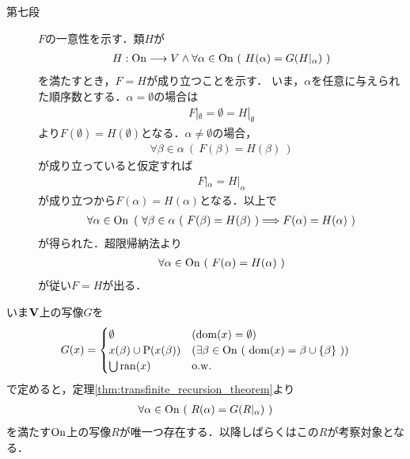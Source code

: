 \begin{prf}
\begin{description}
			\item[第七段]
				$F$の一意性を示す．類$H$が
				\begin{align}
					H:\mathrm{On} \longrightarrow V 
					\wedge \forall \alpha \in \mathrm{On}\ (\ H(\alpha) = G(H|_\alpha)\ )
				\end{align}
				を満たすとき，$F = H$が成り立つことを示す．
				いま，$\alpha$を任意に与えられた順序数とする．$\alpha = \emptyset$の場合は
				\begin{align}
					F|_\emptyset = \emptyset = H|_\emptyset
				\end{align}
				より$F(\emptyset) = H(\emptyset)$となる．$\alpha \neq \emptyset$の場合，
				\begin{align}
					\forall \beta \in \alpha\ (\ F(\beta) = H(\beta)\ )
				\end{align}
				が成り立っていると仮定すれば
				\begin{align}
					F|_\alpha = H|_\alpha
				\end{align}
				が成り立つから$F(\alpha) = H(\alpha)$となる．以上で
				\begin{align}
					\forall \alpha \in \ON\ \left(\ \forall \beta \in \alpha\ 
					(\ F(\beta) = H(\beta)\ ) \Longrightarrow F(\alpha) = H(\alpha)\ \right)
				\end{align}
				が得られた．超限帰納法より
				\begin{align}
					\forall \alpha \in \mathrm{On}\ (\ F(\alpha) = H(\alpha)\ )
				\end{align}
				が従い$F = H$が出る．
				\QED
		\end{description}
	\end{prf}
	
	いま$\mathbf{V}$上の写像$G$を
	\begin{align}
		G(x) = 
		\begin{cases}
			\emptyset & (\operatorname{dom}(x) = \emptyset) \\
			x(\beta) \cup \operatorname{P}(x(\beta)) & (
			\exists \beta \in \mathrm{On}\ (\ \operatorname{dom}(x) = \beta \cup \{\beta\}\ )) \\
			\bigcup \operatorname{ran}(x) & \mathrm{o.w.}
		\end{cases}
	\end{align}
	で定めると，定理\ref{thm:transfinite_recursion_theorem}より
	\begin{align}
		\forall \alpha \in \mathrm{On}\ (\ R(\alpha) = G(R|_\alpha)\ )
	\end{align}
	を満たす$\mathrm{On}$上の写像$R$が唯一つ存在する．以降しばらくはこの$R$が考察対象となる．
	
